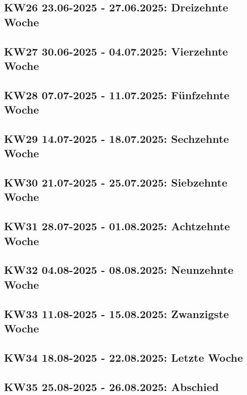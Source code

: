 \subsection{KW26 23.06-2025 - 27.06.2025: Dreizehnte Woche}
\subsection{KW27 30.06-2025 - 04.07.2025: Vierzehnte Woche}
\subsection{KW28 07.07-2025 - 11.07.2025: Fünfzehnte Woche}
\subsection{KW29 14.07-2025 - 18.07.2025: Sechzehnte Woche}
\subsection{KW30 21.07-2025 - 25.07.2025: Siebzehnte Woche}
\subsection{KW31 28.07-2025 - 01.08.2025: Achtzehnte Woche}
\subsection{KW32 04.08-2025 - 08.08.2025: Neunzehnte Woche}
\subsection{KW33 11.08-2025 - 15.08.2025: Zwanzigste Woche}
\subsection{KW34 18.08-2025 - 22.08.2025: Letzte Woche}
\subsection{KW35 25.08-2025 - 26.08.2025: Abschied}